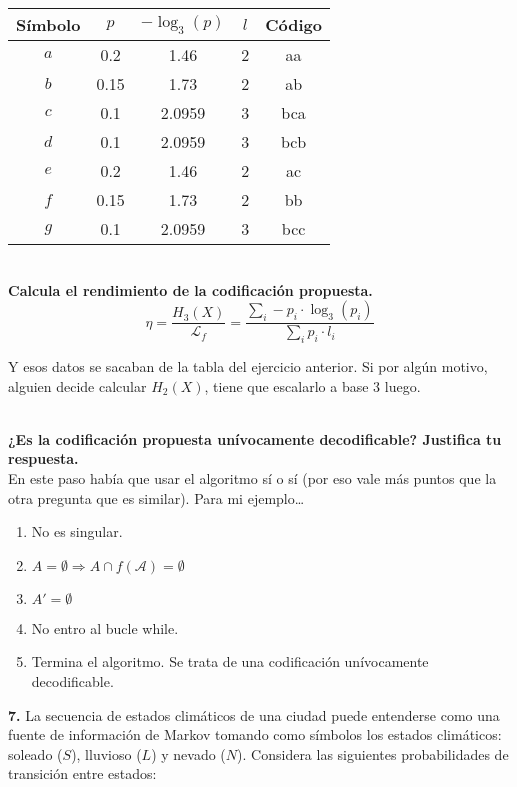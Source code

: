 \documentclass{article}
\begin{document}
\begin{tabular}{|c|c|c|c|c|}
\hline
Símbolo & $p$ & $-\log_3(p)$ & $l$ & Código\\
\hline
$a$ & 0.2 & 1.46 & 2 & aa\\
$b$ & 0.15 & 1.73 & 2 & ab\\
$c$ & 0.1 & 2.0959 & 3 & bca\\
$d$ & 0.1 & 2.0959 & 3 & bcb\\
$e$ & 0.2 & 1.46 & 2 & ac\\
$f$ & 0.15 & 1.73 & 2 & bb\\
$g$ & 0.1 & 2.0959 & 3 & bcc\\
\hline
\end{tabular}

~\\
\textbf{Calcula el rendimiento de la codificación propuesta.}\\

$$
\eta = \frac{H_3(X)}{\mathcal{L}_f} = \frac{\sum_i -p_i\cdot\log_3\left(p_i\right)}{\sum_i p_i\cdot l_i}
$$

Y esos datos se sacaban de la tabla del ejercicio anterior. Si por algún motivo, alguien decide calcular $H_2(X)$, tiene que escalarlo a base 3 luego.


~\\
\textbf{¿Es la codificación propuesta unívocamente decodificable? Justifica tu respuesta.}\\

En este paso había que usar el algoritmo sí o sí (por eso vale más puntos que la otra pregunta que es similar). Para mi ejemplo\dots

\begin{enumerate}
    \item No es singular.
    \item $A = \emptyset \Rightarrow A\cap f(\mathcal{A})=\emptyset$
    \item $A' = \emptyset$
    \item No entro al bucle while.
    \item Termina el algoritmo. Se trata de una codificación unívocamente decodificable.
\end{enumerate}

\textbf{7.} La secuencia de estados climáticos de una ciudad puede entenderse como una fuente de información de Markov tomando como símbolos los estados climáticos: soleado ($S$), lluvioso ($L$) y nevado ($N$). Considera las siguientes probabilidades de transición entre estados:
\end{document}
